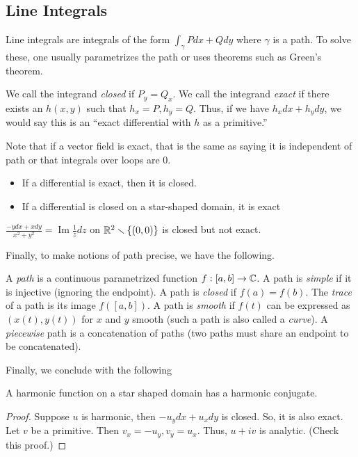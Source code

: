 \documentclass[11pt,leqno,oneside]{amsart}
\renewcommand{\Im}{\operatorname{Im}}
\begin{document}
  \subsection{Line Integrals}
  Line integrals are integrals of the form $\int_\gamma Pdx + Qdy$ where
  $\gamma$ is a path. To solve these, one usually parametrizes the path or uses
  theorems such as Green's theorem.
  \begin{defn}
    We call the integrand \emph{closed} if $P_y = Q_x$. We call the integrand
    \emph{exact} if there exists an $h(x,y)$ such that $h_x = P, h_y = Q$. Thus,
    if we have $h_xdx+h_ydy$, we would say this is an ``exact differential with
    $h$ as a primitive.''
  \end{defn}
  Note that if a vector field is exact, that is the same as saying it is
  independent of path or that integrals over loops are 0.
  \begin{rmk}
    \begin{itemize}
    \item If a differential is exact, then it is closed.
    \item If a differential is closed on a star-shaped domain, it is exact
    \end{itemize}
  \end{rmk}
  \begin{example}
    $\frac{-ydx+xdy}{x^2+y^2} = \Im \frac{1}{z}dz$ on ${\mathbb R}^2 \smallsetminus
    \{(0,0)\}$ is closed but not exact.
  \end{example}
  Finally, to make notions of path precise, we have the following.
\begin{defn}
    A \emph{path} is a continuous parametrized function $f:[a,b] \to {\mathbb C}$.  A
    path is \emph{simple} if it is injective (ignoring the endpoint).  A path is
    \emph{closed} if $f(a) = f(b)$.  The \emph{trace} of a path is its image
    $f([a,b])$.  A path is \emph{smooth} if $f(t)$ can be expressed as $(x(t),
    y(t))$ for $x$ and $y$ smooth (such a path is also called a \emph{curve}).
    A \emph{piecewise} path is a concatenation of paths (two paths must share an
    endpoint to be concatenated).
  \end{defn}

  Finally, we conclude with the following
  \begin{thm}
    A harmonic function on a star shaped domain has a harmonic conjugate.
  \end{thm}
  \begin{proof}
    Suppose $u$ is harmonic, then $-u_ydx+u_xdy$ is closed. So, it is also
    exact. Let $v$ be a primitive. Then $v_x = -u_y, v_y=u_x$. Thus, $u+iv$ is
    analytic. (Check this proof.)
  \end{proof}
\end{document}
